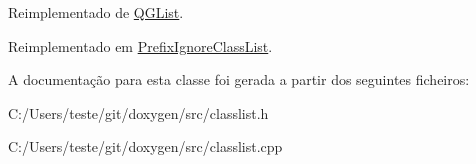 Reimplementado de \hyperlink{class_q_g_list_aac689c6d7a54b6558afbd53845183af8}{Q\-G\-List}.



Reimplementado em \hyperlink{class_prefix_ignore_class_list_aade9045d8c0047e0427d8c6a9c048985}{Prefix\-Ignore\-Class\-List}.



A documentação para esta classe foi gerada a partir dos seguintes ficheiros\-:\begin{DoxyCompactItemize}
\item 
C\-:/\-Users/teste/git/doxygen/src/classlist.\-h\item 
C\-:/\-Users/teste/git/doxygen/src/classlist.\-cpp\end{DoxyCompactItemize}
